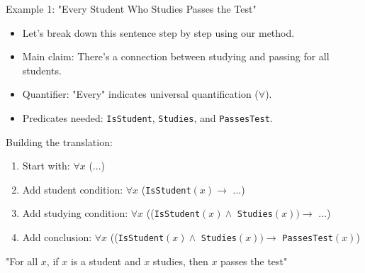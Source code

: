 \documentclass{beamer}
\begin{document}
	\begin{frame}{Example 1: "Every Student Who Studies Passes the Test"}
		\begin{itemize}
			\item Let's break down this sentence step by step using our method.
			\item Main claim: There's a connection between studying and passing for all students.
			\item Quantifier: "Every" indicates universal quantification ($\forall$).
			\item Predicates needed: \texttt{IsStudent}, \texttt{Studies}, and \texttt{PassesTest}.
		\end{itemize}
		
		\begin{example}
			Building the translation:
			\begin{enumerate}
				\item Start with: $\forall x$ (...)
				\item Add student condition: $\forall x$ (\texttt{IsStudent}$(x) \rightarrow$ ...)
				\item Add studying condition: $\forall x$ ((\texttt{IsStudent}$(x) \land$ \texttt{Studies}$(x)) \rightarrow$ ...)
				\item Add conclusion: $\forall x$ ((\texttt{IsStudent}$(x) \land$ \texttt{Studies}$(x)) \rightarrow$ \texttt{PassesTest}$(x)$)
			\end{enumerate}
			"For all $x$, if $x$ is a student and $x$ studies, then $x$ passes the test"
		\end{example}
	\end{frame}
	
\end{document}
